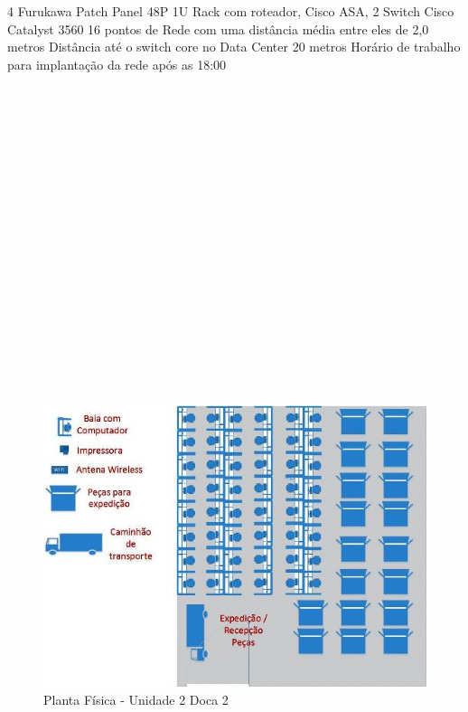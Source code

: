 \documentclass[	DIV=calc,%
							paper=a4,%
							fontsize=12pt,%
							onecolumn]{scrartcl}	 					%
\begin{document}
4 Furukawa Patch Panel 48P 1U
Rack com roteador, Cisco ASA, 2 Switch Cisco Catalyst 3560
16 pontos de Rede com uma distância média entre eles de 2,0 metros
Distância até o switch core no Data Center 20 metros
Horário de trabalho para implantação da rede após as 18:00
\\
\\
\\
\\
\\
\\
\\
\\
\\
\\
\\
\\
\\
\\
\\
\\
\\
\\
\\
\begin{figure}
	\centering
	\includegraphics[]{fig7}
	\caption{Planta Física - Unidade 2 Doca 2 }
	\label{fig7}
\end{figure}
\end{document}
